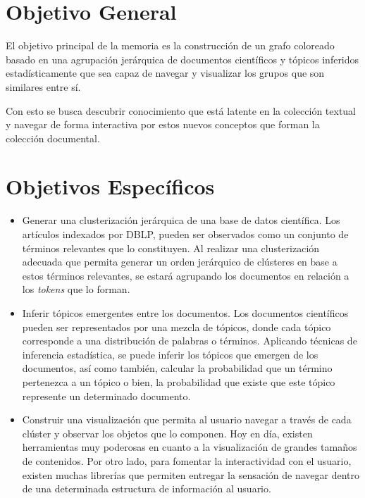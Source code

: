 \documentclass[12pt,oneside,letterpaper]{book}
\newcommand{\eng}[1]{\textit{#1}\xspace}			%
\theoremstyle{definition}
\begin{document}
\section{Objetivo General}
\label{sec:objetivo_general}
El objetivo principal de la memoria es la construcción de un grafo coloreado basado en una agrupación jerárquica de documentos científicos y tópicos inferidos estadísticamente que sea capaz de navegar y visualizar los grupos que son similares entre sí. 

Con esto se busca descubrir conocimiento que está latente en la colección textual y navegar de forma interactiva por estos nuevos conceptos que forman la colección documental. 

\section{Objetivos Específicos}
\label{sec:objetivos_especificos}
\begin{itemize}
	\item Generar una clusterización jerárquica de una base de datos científica.
	Los artículos indexados por DBLP, pueden ser observados como un conjunto de términos relevantes que lo constituyen. Al realizar una clusterización adecuada que permita generar un orden jerárquico de clústeres en base a estos términos relevantes, se estará agrupando los documentos en relación a los \eng{tokens} que lo forman.

	\item Inferir tópicos emergentes entre los documentos.
	Los documentos científicos pueden ser representados por una mezcla de tópicos, donde cada tópico corresponde a una distribución de palabras o términos. Aplicando técnicas de inferencia estadística, se puede inferir los tópicos que emergen de los documentos, así como también, calcular la probabilidad que un término pertenezca a un tópico o bien, la probabilidad que existe que este tópico represente un determinado documento.

	\item Construir una visualización que permita al usuario navegar a través de cada clúster y observar los objetos que lo componen.
	Hoy en día, existen herramientas muy poderosas en cuanto a la visualización de grandes tamaños de contenidos. Por otro lado, para fomentar la interactividad con el usuario, existen muchas librerías que permiten entregar la sensación de navegar dentro de una determinada estructura de información al usuario.
\end{itemize}
\end{document}
